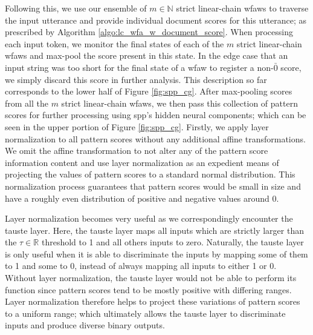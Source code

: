 Following this, we use our ensemble of $m \in \mathbb{N}$ strict linear-chain
\ac{wfaws} to traverse the input utterance and provide individual document
scores for this utterance; as prescribed by Algorithm
\ref{algo:lc_wfa_w_document_score}. When processing each input token, we monitor
the final states of each of the $m$ strict linear-chain \ac{wfaws} and
max-pool the score present in this state. In the edge case that an input string
was too short for the final state of a \ac{wfaw} to register a non-$\bar{0}$
score, we simply discard this score in further analysis. This description so far
corresponds to the lower half of Figure \ref{fig:spp_cg}. After max-pooling
scores from all the $m$ strict linear-chain \ac{wfaws}, we then pass this
collection of pattern scores for further processing using \ac{spp}'s hidden neural
components; which can be seen in the upper portion of Figure \ref{fig:spp_cg}.
Firstly, we apply layer normalization \citep{ba2016layer} to all pattern scores
without any additional affine transformations. We omit the affine transformation
to not alter any of the pattern score information content and use layer
normalization as an expedient means of projecting the values of pattern scores
to a standard normal distribution. This normalization process guarantees that
pattern scores would be small in size and have a roughly even distribution of
positive and negative values around 0.

Layer normalization becomes very useful as we correspondingly encounter the
\ac{tauste} layer. Here, the \ac{tauste} layer maps all inputs which are strictly larger
than the $\tau \in \mathbb{R}$ threshold to 1 and all others inputs to zero.
Naturally, the \ac{tauste} layer is only useful when it is able to discriminate the
inputs by mapping some of them to 1 and some to 0, instead of always mapping all
inputs to either 1 or 0. Without layer normalization, the \ac{tauste} layer would not
be able to perform its function since pattern scores tend to be mostly positive
with differing ranges. Layer normalization therefore helps to project these
variations of pattern scores to a uniform range; which ultimately allows the \ac{tauste}
layer to discriminate inputs and produce diverse binary outputs.


